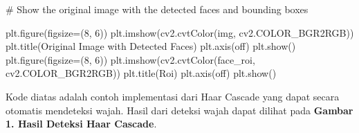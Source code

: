 \documentclass[
  letterpaper,
  DIV=11,
  numbers=noendperiod]{scrreprt}
\newenvironment{Shaded}{\begin{snugshade}}{\end{snugshade}}
\newcommand{\CommentTok}[1]{\textcolor[rgb]{0.37,0.37,0.37}{#1}}
\newcommand{\DecValTok}[1]{\textcolor[rgb]{0.68,0.00,0.00}{#1}}
\newcommand{\NormalTok}[1]{\textcolor[rgb]{0.00,0.23,0.31}{#1}}
\newcommand{\OperatorTok}[1]{\textcolor[rgb]{0.37,0.37,0.37}{#1}}
\newcommand{\StringTok}[1]{\textcolor[rgb]{0.13,0.47,0.30}{#1}}
\begin{document}
\begin{Shaded}
\begin{Highlighting}[]
    \CommentTok{\# Show the original image with the detected faces and bounding boxes}
    
\NormalTok{    plt.figure(figsize}\OperatorTok{=}\NormalTok{(}\DecValTok{8}\NormalTok{, }\DecValTok{6}\NormalTok{))}
\NormalTok{    plt.imshow(cv2.cvtColor(img, cv2.COLOR\_BGR2RGB))}
\NormalTok{    plt.title(}\StringTok{\textquotesingle{}Original Image with Detected Faces\textquotesingle{}}\NormalTok{)}
\NormalTok{    plt.axis(}\StringTok{\textquotesingle{}off\textquotesingle{}}\NormalTok{)}
\NormalTok{    plt.show()}
\NormalTok{    plt.figure(figsize}\OperatorTok{=}\NormalTok{(}\DecValTok{8}\NormalTok{, }\DecValTok{6}\NormalTok{))}
\NormalTok{    plt.imshow(cv2.cvtColor(face\_roi, cv2.COLOR\_BGR2RGB))}
\NormalTok{    plt.title(}\StringTok{\textquotesingle{}Roi\textquotesingle{}}\NormalTok{)}
\NormalTok{    plt.axis(}\StringTok{\textquotesingle{}off\textquotesingle{}}\NormalTok{)}
\NormalTok{    plt.show()  }
\end{Highlighting}
\end{Shaded}

Kode diatas adalah contoh implementasi dari Haar Cascade yang dapat
secara otomatis mendeteksi wajah. Hasil dari deteksi wajah dapat dilihat
pada \textbf{Gambar 1. Hasil Deteksi Haar Cascade}.
\end{document}
